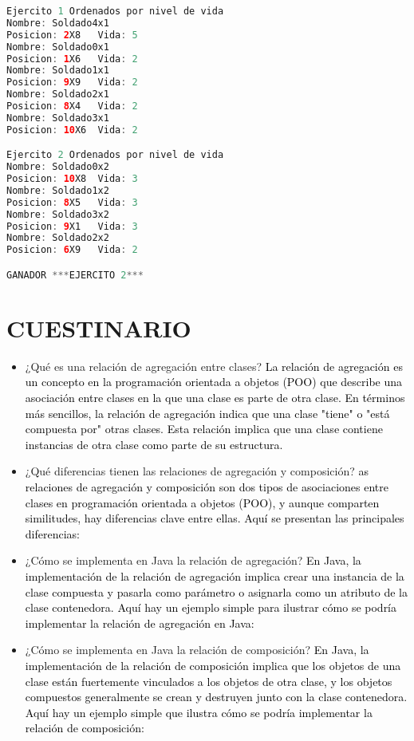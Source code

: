 \documentclass{article}
\begin{document}
\begin{itemize}
\begin{itemize}
\begin{lstlisting}[language=java]
Ejercito 1 Ordenados por nivel de vida
Nombre: Soldado4x1
Posicion: 2X8   Vida: 5
Nombre: Soldado0x1
Posicion: 1X6   Vida: 2
Nombre: Soldado1x1
Posicion: 9X9   Vida: 2
Nombre: Soldado2x1
Posicion: 8X4   Vida: 2
Nombre: Soldado3x1
Posicion: 10X6  Vida: 2

Ejercito 2 Ordenados por nivel de vida
Nombre: Soldado0x2
Posicion: 10X8  Vida: 3
Nombre: Soldado1x2
Posicion: 8X5   Vida: 3
Nombre: Soldado3x2
Posicion: 9X1   Vida: 3
Nombre: Soldado2x2
Posicion: 6X9   Vida: 2

GANADOR ***EJERCITO 2***
        \end{lstlisting}

    
	\end{itemize}

 \section{CUESTINARIO}
	\begin{itemize}
		\item ¿Qué es una relación de agregación entre clases?
  \textcolor{black}{La relación de agregación es un concepto en la programación orientada a objetos (POO) que describe una asociación entre clases en la que una clase es parte de otra clase. En términos más sencillos, la relación de agregación indica que una clase "tiene" o "está compuesta por" otras clases. Esta relación implica que una clase contiene instancias de otra clase como parte de su estructura.}
		\item ¿Qué diferencias tienen las relaciones de agregación y composición?
  \textcolor{black}{as relaciones de agregación y composición son dos tipos de asociaciones entre clases en programación orientada a objetos (POO), y aunque comparten similitudes, hay diferencias clave entre ellas. Aquí se presentan las principales diferencias:}
		\item ¿Cómo se implementa en Java la relación de agregación? 
  \textcolor{black}{En Java, la implementación de la relación de agregación implica crear una instancia de la clase compuesta y pasarla como parámetro o asignarla como un atributo de la clase contenedora. Aquí hay un ejemplo simple para ilustrar cómo se podría implementar la relación de agregación en Java:}
        \item ¿Cómo se implementa en Java la relación de composición?
        \textcolor{black}{En Java, la implementación de la relación de composición implica que los objetos de una clase están fuertemente vinculados a los objetos de otra clase, y los objetos compuestos generalmente se crean y destruyen junto con la clase contenedora. Aquí hay un ejemplo simple que ilustra cómo se podría implementar la relación de composición: }

\end{itemize}
\end{itemize}
\end{document}
